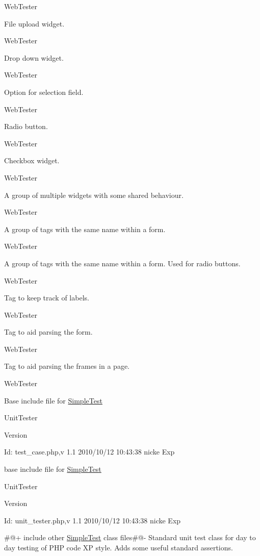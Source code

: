 WebTester

File upload widget.

WebTester

Drop down widget.

WebTester

Option for selection field.

WebTester

Radio button.

WebTester

Checkbox widget.

WebTester

A group of multiple widgets with some shared behaviour.

WebTester

A group of tags with the same name within a form.

WebTester

A group of tags with the same name within a form. Used for radio buttons.

WebTester

Tag to keep track of labels.

WebTester

Tag to aid parsing the form.

WebTester

Tag to aid parsing the frames in a page.

WebTester

Base include file for \hyperlink{class_simple_test}{SimpleTest}

UnitTester \begin{DoxyVersion}{Version}

\end{DoxyVersion}
\begin{DoxyParagraph}{Id:}
test\_\-case.php,v 1.1 2010/10/12 10:43:38 nicke Exp 
\end{DoxyParagraph}


base include file for \hyperlink{class_simple_test}{SimpleTest}

UnitTester \begin{DoxyVersion}{Version}

\end{DoxyVersion}
\begin{DoxyParagraph}{Id:}
unit\_\-tester.php,v 1.1 2010/10/12 10:43:38 nicke Exp 
\end{DoxyParagraph}


\#@+ include other \hyperlink{class_simple_test}{SimpleTest} class files\#@-\/ Standard unit test class for day to day testing of PHP code XP style. Adds some useful standard assertions.


